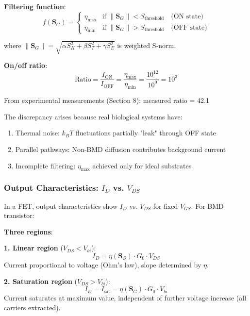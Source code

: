 \documentclass[11pt,a4paper]{article}
\begin{document}
\textbf{Filtering function}:
\begin{equation}
f(\mathbf{S}_G) = \begin{cases}
\eta_{\max} & \text{if } \|\mathbf{S}_G\| < S_{\text{threshold}} \quad \text{(ON state)} \\
\eta_{\min} & \text{if } \|\mathbf{S}_G\| > S_{\text{threshold}} \quad \text{(OFF state)}
\end{cases}
\end{equation}

where $\|\mathbf{S}_G\| = \sqrt{\alpha S_K^2 + \beta S_T^2 + \gamma S_E^2}$ is weighted S-norm.

\textbf{On/off ratio}:
\begin{equation}
\text{Ratio} = \frac{I_{\text{ON}}}{I_{\text{OFF}}} = \frac{\eta_{\max}}{\eta_{\min}} = \frac{10^{12}}{10^{9}} = 10^3
\end{equation}

From experimental measurements (Section 8): measured ratio = 42.1

The discrepancy arises because real biological systems have:
\begin{enumerate}
\item Thermal noise: $k_B T$ fluctuations partially "leak" through OFF state
\item Parallel pathways: Non-BMD diffusion contributes background current
\item Incomplete filtering: $\eta_{\max}$ achieved only for ideal substrates
\end{enumerate}

\subsubsection{Output Characteristics: $I_D$ vs. $V_{DS}$}

In a FET, output characteristics show $I_D$ vs. $V_{DS}$ for fixed $V_{GS}$. For BMD transistor:

\textbf{Three regions}:

\textbf{1. Linear region} ($V_{DS} < V_{bi}$):
\begin{equation}
I_D = \eta(\mathbf{S}_G) \cdot G_0 \cdot V_{DS}
\end{equation}
Current proportional to voltage (Ohm's law), slope determined by $\eta$.

\textbf{2. Saturation region} ($V_{DS} > V_{bi}$):
\begin{equation}
I_D = I_{\text{sat}} = \eta(\mathbf{S}_G) \cdot G_0 \cdot V_{bi}
\end{equation}
Current saturates at maximum value, independent of further voltage increase (all carriers extracted).
\end{document}
